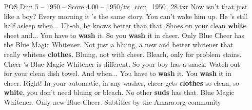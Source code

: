 \begin{textsample}{POS Dim 5 – 1950 – Score 4.00 – 1950/tv\_com\_1950\_28.txt}  \label{ex:f5_pos_048}
Now isn't that just like a boy?
Every morning it 's the same story.
You can't wake him up.
He 's still half asleep when...
Uh-oh, he knows better than that.
Shoes on your clean \textbf{white} sheet and...
You have to \textbf{wash} it.
So you \textbf{wash} it in cheer.
Only Blue Cheer has the Blue Magic Whitener.
Not just a bluing, a new and better whitener that really whitens \textbf{clothes}.
Bluing, not with cheer.
Bleach, only for problem stains.
Cheer 's Blue Magic Whitener is different.
So your boy has a snack.
Watch out for your clean dish towel.
And when...
You have to \textbf{wash} it.
You \textbf{wash} it in cheer.
Right!
In your automatic, in any washer, cheer gets \textbf{clothes} so clean, so \textbf{white}, you don't need bluing or bleach.
No other \textbf{suds} has that.
Blue Magic Whitener.
Only new Blue Cheer.
Subtitles by the Amara.org community

\end{textsample}
